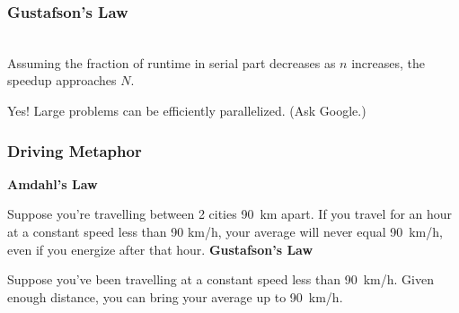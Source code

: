 \begin{frame}
  \frametitle{Gustafson's Law}

\hspace*{2em}
  \\[1em]

  Assuming the fraction of runtime in serial part decreases as $n$ increases,
  the speedup approaches $N$.


Yes! Large problems can be efficiently parallelized. (Ask Google.)

\end{frame}

\begin{frame}
  \frametitle{Driving Metaphor}

  {\bf Amdahl's Law}
  
  Suppose you're travelling between 2 cities 90~km apart. If you travel for an
  hour at a constant speed less than 90 km/h, your average will never equal
  90~km/h, even if you energize after that hour.
  \vfill
  {\bf Gustafson's Law}

  Suppose you've been travelling at a constant speed less than 90~km/h. Given
  enough distance, you can bring your average up to 90~km/h.
\end{frame}



